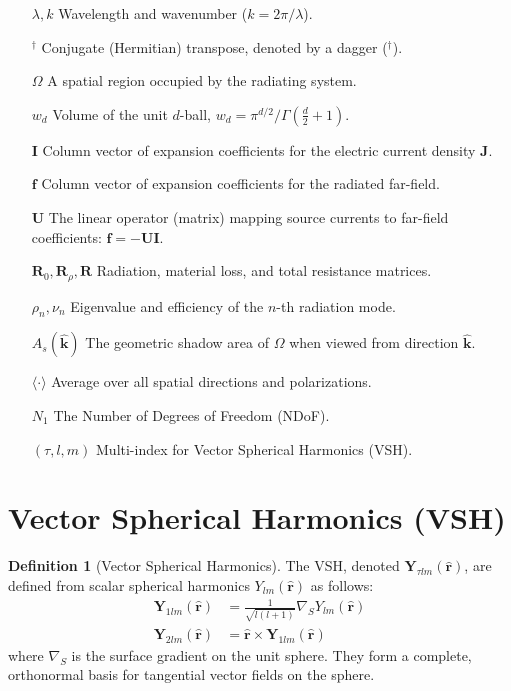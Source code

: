\documentclass[12pt,a4paper]{article}
\theoremstyle{definition}
\newtheorem{definition}[theorem]{Definition}
\newcommand{\vect}[1]{\mathbf{#1}}
\newcommand{\uvect}[1]{\mathbf{\hat{#1}}}
\newcommand{\herm}{^{\dagger}} %
\begin{document}
\begin{itemize}
    \item[$\lambda, k$] Wavelength and wavenumber ($k=2\pi/\lambda$).
    \item[$\herm$] Conjugate (Hermitian) transpose, denoted by a dagger ($^\dagger$).
    \item[$\Omega$] A spatial region occupied by the radiating system.
    \item[$w_d$] Volume of the unit $d$-ball, $w_d=\pi^{d/2}/\Gamma(\tfrac d2+1)$.
    \item[$\vect{I}$] Column vector of expansion coefficients for the electric current density $\vect{J}$.
    \item[$\vect{f}$] Column vector of expansion coefficients for the radiated far-field.
    \item[$\vect{U}$] The linear operator (matrix) mapping source currents to far-field coefficients: $\vect{f} = -\vect{U}\vect{I}$.
    \item[$\vect{R}_0, \vect{R}_\rho, \vect{R}$] Radiation, material loss, and total resistance matrices.
    \item[$\rho_n, \nu_n$] Eigenvalue and efficiency of the $n$-th radiation mode.
    \item[$A_s(\uvect{k})$] The geometric shadow area of $\Omega$ when viewed from direction $\uvect{k}$.
    \item[$\langle \cdot \rangle$] Average over all spatial directions and polarizations.
    \item[$N_1$] The Number of Degrees of Freedom (NDoF).
    \item[$(\tau, l, m)$] Multi-index for Vector Spherical Harmonics (VSH).
\end{itemize}

\section{Vector Spherical Harmonics (VSH)}
\label{sec:vsh}

\begin{definition}[Vector Spherical Harmonics]
The VSH, denoted $\vect{Y}_{\tau lm}(\uvect{r})$, are defined from scalar spherical harmonics $Y_{lm}(\uvect{r})$ as follows:
\begin{align*}
    \vect{Y}_{1lm}(\uvect{r}) &= \frac{1}{\sqrt{l(l+1)}} \nabla_S Y_{lm}(\uvect{r}) \\
    \vect{Y}_{2lm}(\uvect{r}) &= \uvect{r} \times \vect{Y}_{1lm}(\uvect{r})
\end{align*}
where $\nabla_S$ is the surface gradient on the unit sphere. They form a complete, orthonormal basis for tangential vector fields on the sphere.
\end{definition}
\end{document}

